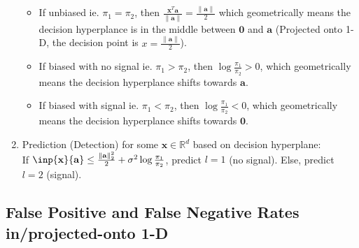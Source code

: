 \documentclass[11pt]{article}
\newcommand{\R}{\mathbb{R}}
\newcommand{\norm}[1]{\left\lVert#1\right\rVert}
\begin{document}
\begin{enumerate}
\begin{itemize}
    
        \item If unbiased ie. $\pi_1=\pi_2$, then $\frac{\mathbf{x}^T\mathbf{a}}{\norm {\mathbf{a} }} = \frac{\norm {\mathbf{a} }}{2}$ which geometrically means the decision hyperplance is in the middle between $\mathbf{0}$ and $\mathbf{a}$ (Projected onto 1-D, the decision point is $x=\frac{\norm {\mathbf{a} }}{2}$).
        \item If biased with no signal ie. $\pi_1>\pi_2$, then $\log{\frac{\pi_1}{\pi_2}}>0$, which geometrically means the decision hyperplance shifts towards $\mathbf{a}$.
        \item If biased with signal ie. $\pi_1<\pi_2$, then $\log{\frac{\pi_1}{\pi_2}}<0$, which geometrically means the decision hyperplance shifts towards $\mathbf{0}$.
    \end{itemize}
    
    \item Prediction (Detection) for some $\mathbf{x} \in \R^d$ based on decision hyperplane:\\
    If $\inp {\mathbf{x}} {\mathbf{a}} \leq \frac{\norm {\mathbf{a} }_2^2}{2} + \sigma^2\log{\frac{\pi_1}{\pi_2}}$, predict $l=1$ (no signal). Else, predict $l=2$ (signal).
    
\end{enumerate}

\subsection{False Positive and False Negative Rates in/projected-onto 1-D}
    
\end{document}
